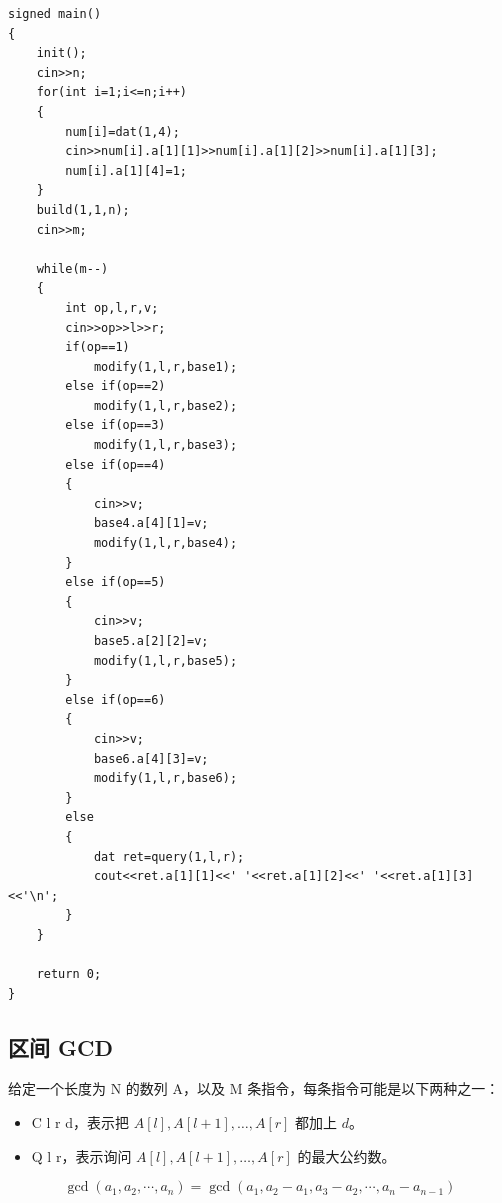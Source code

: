 \begin{verbatim}
signed main()
{
    init();
    cin>>n;
    for(int i=1;i<=n;i++)
    {
        num[i]=dat(1,4);
        cin>>num[i].a[1][1]>>num[i].a[1][2]>>num[i].a[1][3];
        num[i].a[1][4]=1;
    }
    build(1,1,n);
    cin>>m;

    while(m--)
    {
        int op,l,r,v;
        cin>>op>>l>>r;
        if(op==1)
            modify(1,l,r,base1);
        else if(op==2)
            modify(1,l,r,base2);
        else if(op==3)
            modify(1,l,r,base3);
        else if(op==4)
        {
            cin>>v;
            base4.a[4][1]=v;
            modify(1,l,r,base4);
        }
        else if(op==5)
        {
            cin>>v;
            base5.a[2][2]=v;
            modify(1,l,r,base5);
        }
        else if(op==6)
        {
            cin>>v;
            base6.a[4][3]=v;
            modify(1,l,r,base6);
        }
        else
        {
            dat ret=query(1,l,r);
            cout<<ret.a[1][1]<<' '<<ret.a[1][2]<<' '<<ret.a[1][3]<<'\n';
        }
    }

    return 0;
}
\end{verbatim}
\subsection{区间 GCD}

\begin{tcolorbox}
给定一个长度为 N 的数列 A，以及 M 条指令，每条指令可能是以下两种之一：
\begin{itemize}
\item C l r d，表示把 $A[l],A[l+1],…,A[r]$ 都加上 $d$。
\item Q l r，表示询问 $A[l],A[l+1],…,A[r]$ 的最大公约数。
\end{itemize}
\end{tcolorbox}

$$
\operatorname{gcd}\left(a_1, a_2, \cdots, a_n\right)=\operatorname{gcd}\left(a_1, a_2-a_1, a_3-a_2, \cdots, a_n-a_{n-1}\right)
$$

